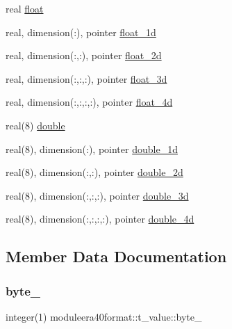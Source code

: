 \begin{DoxyCompactItemize}
real \mbox{\hyperlink{structmoduleera40format_1_1t__value_a38f8ebcbf09805f96ec36c7eec2e03a0}{float}}
\item 
real, dimension(\+:), pointer \mbox{\hyperlink{structmoduleera40format_1_1t__value_a4a4fea303c247ffb03ffb1b0f2aa7411}{float\+\_\+1d}}
\item 
real, dimension(\+:,\+:), pointer \mbox{\hyperlink{structmoduleera40format_1_1t__value_a614350b36776982a2bbb613f822b5fd6}{float\+\_\+2d}}
\item 
real, dimension(\+:,\+:,\+:), pointer \mbox{\hyperlink{structmoduleera40format_1_1t__value_a4eb5f5c2c350098565b762ef6904f714}{float\+\_\+3d}}
\item 
real, dimension(\+:,\+:,\+:,\+:), pointer \mbox{\hyperlink{structmoduleera40format_1_1t__value_a429ee69fe7dbde24061dbbfd502d1b00}{float\+\_\+4d}}
\item 
real(8) \mbox{\hyperlink{structmoduleera40format_1_1t__value_a96a0fc529676c04fb758ec1066f7744a}{double}}
\item 
real(8), dimension(\+:), pointer \mbox{\hyperlink{structmoduleera40format_1_1t__value_abed2c470bbe43c37807a083a682be06b}{double\+\_\+1d}}
\item 
real(8), dimension(\+:,\+:), pointer \mbox{\hyperlink{structmoduleera40format_1_1t__value_a1c4f49abebbfb3c43466778f0e602e73}{double\+\_\+2d}}
\item 
real(8), dimension(\+:,\+:,\+:), pointer \mbox{\hyperlink{structmoduleera40format_1_1t__value_a2a35b435ca3ee906b99498ca5413909f}{double\+\_\+3d}}
\item 
real(8), dimension(\+:,\+:,\+:,\+:), pointer \mbox{\hyperlink{structmoduleera40format_1_1t__value_a7bba37f24a0f9e317479e0cb679c6170}{double\+\_\+4d}}
\end{DoxyCompactItemize}


\subsection{Member Data Documentation}
\mbox{\label{structmoduleera40format_1_1t__value_ab0cef5cfd7be066267dedff8303c4178}} 
\subsubsection{\texorpdfstring{byte\+\_\+}{byte\_}}
{\footnotesize\ttfamily integer(1) moduleera40format\+::t\+\_\+value\+::byte\+\_\+\hspace{0.3cm}{\ttfamily [private]}}

